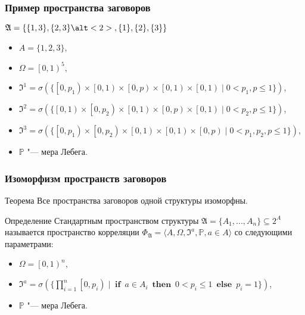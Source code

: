 \begin{frame}
	\frametitle{Пример пространства заговоров}
	\begin{block}{$\mathfrak{A} = \{\{1,3\},\{2,3\}\alt<2>{}{,\{1\},\{2\},\{3\}}\}$}
		\begin{itemize}
			\item $A = \{1, 2, 3\}$,
			\item $\Omega = \left[0, 1\right)^5$,
			\item $\mathfrak{I}^1 = \sigma(\{\left[ 0, p_1 \right) \times \left[ 0, 1 \right) \times \left[ 0, p \right) \times \left[ 0, 1 \right) \times \left[ 0, 1 \right) \mid 0 < p_1, p \leq 1 \})$,
			\item $\mathfrak{I}^2 = \sigma(\{\left[ 0, 1 \right) \times \left[ 0, p_2 \right) \times \left[ 0, 1 \right) \times \left[ 0, p \right) \times \left[ 0, 1 \right) \mid 0 < p_2, p \leq 1 \})$,
			\item $\mathfrak{I}^3 = \sigma(\{\left[ 0, p_1 \right) \times \left[ 0, p_2 \right) \times \left[ 0, 1 \right) \times \left[ 0, 1 \right) \times \left[ 0, p \right) \mid 0 < p_1, p_2, p \leq 1 \})$,
			\item $\mathbb{P}$ "--- мера Лебега.
		\end{itemize}
	\end{block}
\end{frame}

\begin{frame}
	\frametitle{Изоморфизм пространств заговоров}
	\begin{block}{Теорема}
		Все пространства заговоров одной структуры изоморфны.
	\end{block}
	\begin{block}{Определение}
		Стандартным пространством структуры $\mathfrak{A} = \{A_1, ..., A_n\} \subseteq 2^A$ называется пространство корреляции $\Phi_{\mathfrak{A}} = \langle A, \Omega, \mathfrak{I}^a, \mathbb{P}, a \in A \rangle$ со следующими параметрами:
		\begin{itemize}
			\item $\Omega = \left[0, 1\right)^n$,
			\item $\mathfrak{I}^a = \sigma(\{\prod\limits_{i=1}^n\left[ 0, p_i \right) \mid \operatorname{\mathbf{if}} \: a \in A_i \: \operatorname{\mathbf{then}} \: 0 < p_i \leq 1 \: \operatorname{\mathbf{else}} \: p_i = 1 \})$,
			\item $\mathbb{P}$ "--- мера Лебега.
		\end{itemize}
	\end{block}
\end{frame}

